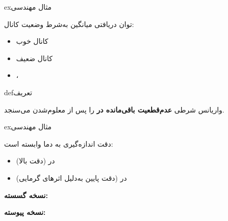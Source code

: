 \begin{PSbox}[unbreakable]{ex}{مثال مهندسی}

توان دریافتی میانگین به‌شرط وضعیت کانال:

\begin{itemize}
\tightlist
\item
  کانال خوب 
\item
  کانال ضعیف 
\item
  ، 
\end{itemize}

\end{PSbox}


\begin{PSbox}[unbreakable]{def}{تعریف}


\end{PSbox}


واریانس شرطی \textbf{عدم‌قطعیت باقی‌مانده در } را پس از معلوم‌شدن  می‌سنجد.

\begin{PSbox}[unbreakable]{ex}{مثال مهندسی}

دقت اندازه‌گیری به دما وابسته است:

\begin{itemize}
\tightlist
\item
  در  (دقت بالا)
\item
  در  (دقت پایین به‌دلیل اثرهای گرمایی)
\end{itemize}

\end{PSbox}




\textbf{نسخه گسسته:}

\textbf{نسخه پیوسته:}

